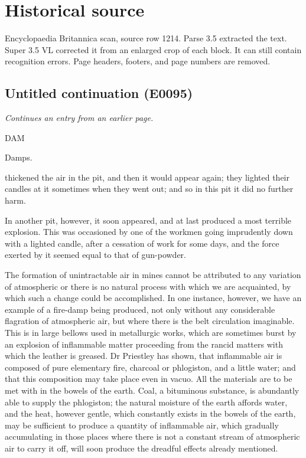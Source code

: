 \documentclass{article}
\begin{document}
\section*{Historical source}
Encyclopaedia Britannica scan, source row 1214. Parse 3.5 extracted the text. Super 3.5 VL corrected it from an enlarged crop of each block. It can still contain recognition errors.
Page headers, footers, and page numbers are removed.

\subsection*{Untitled continuation (E0095)}
\textit{Continues an entry from an earlier page.}

DAM

Damps.

thickened the air in the pit, and then it would appear again; they lighted their candles at it sometimes when they went out; and so in this pit it did no further harm.

In another pit, however, it soon appeared, and at last produced a most terrible explosion. This was occasioned by one of the workmen going imprudently down with a lighted candle, after a cessation of work for some days, and the force exerted by it seemed equal to that of gun-powder.

The formation of unintractable air in mines cannot be attributed to any variation of atmospheric or there is no natural process with which we are acquainted, by which such a change could be accomplished. In one instance, however, we have an example of a fire-damp being produced, not only without any considerable flagration of atmospheric air, but where there is the belt circulation imaginable. This is in large bellows used in metallurgic works, which are sometimes burst by an explosion of inflammable matter proceeding from the rancid matters with which the leather is greased. Dr Priestley has shown, that inflammable air is composed of pure elementary fire, charcoal or phlogiston, and a little water; and that this composition may take place even in vacuo. All the materials are to be met with in the bowels of the earth. Coal, a bituminous substance, is abundantly able to supply the phlogiston; the natural moisture of the earth affords water, and the heat, however gentle, which constantly exists in the bowels of the earth, may be sufficient to produce a quantity of inflammable air, which gradually accumulating in those places where there is not a constant stream of atmospheric air to carry it off, will soon produce the dreadful effects already mentioned.
\end{document}
